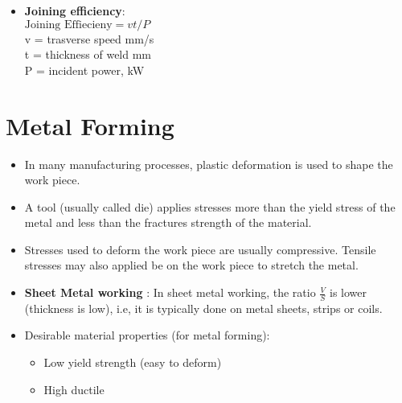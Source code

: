 \documentclass{article}
\begin{document}
\begin{itemize}
			\item \textbf{Joining efficiency}:\\
				$\text{Joining Effiecieny} = vt/P$\\
				v = trasverse speed mm/s\\
				t = thickness of weld mm\\
				P = incident power, kW\\

		\end{itemize}
	
\pagebreak


\section{Metal Forming}
	\begin{itemize}
		\item In many manufacturing processes, plastic deformation is used to shape the work piece.
		\item A tool (usually called die) applies stresses more than the yield stress of the metal and less than the fractures strength of the material.
		\item Stresses used to deform the work piece are usually compressive. Tensile stresses may also applied be on the work piece to stretch the metal. 
		\item \textbf{Sheet Metal working} : In sheet metal working, the ratio $\frac{V}{S}$ is lower (thickness is low), i.e, it is typically done on metal sheets, strips or coils. 
		\item Desirable material properties (for metal forming):
			\begin{itemize}
				\item Low yield strength (easy to deform)
				\item High ductile
			\end{itemize}
	\end{itemize}
\end{document}
